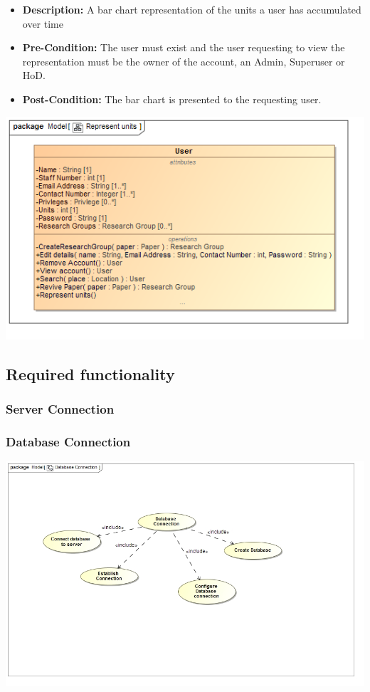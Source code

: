\documentclass[11pt]{article}
\begin{document}
\begin{itemize}
		\begin{itemize}
			\item \textbf{Description: }A bar chart representation of the units a user has accumulated over time
			\item \textbf{Pre-Condition: }The user must exist and the user requesting to view the representation must be the owner of the account, an Admin, Superuser or HoD.
			\item \textbf{Post-Condition: }The bar chart is presented to the requesting user.
		\end{itemize}
		\begin{center}
			\includegraphics[width=\textwidth]{../DomainModel/Representunits.png}\\[0.5cm]
		\end{center}
	\end{itemize}
	
	\subsection{Required functionality}
	
	\subsubsection{Server Connection}
	\subsubsection{Database Connection}
	\begin{center}
		\includegraphics[width=\textwidth]{../Images/DatabaseConnectionUC.jpg}\\[0.5cm]
	\end{center}
\end{document}
